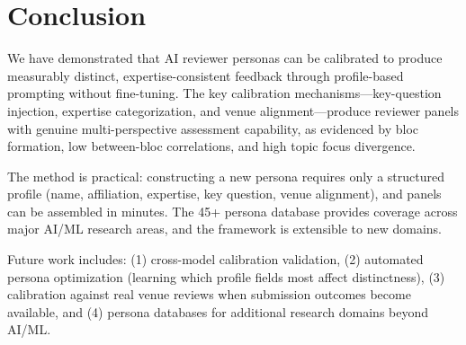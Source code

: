 \section{Conclusion}

We have demonstrated that AI reviewer personas can be calibrated to produce measurably distinct, expertise-consistent feedback through profile-based prompting without fine-tuning. The key calibration mechanisms---key-question injection, expertise categorization, and venue alignment---produce reviewer panels with genuine multi-perspective assessment capability, as evidenced by bloc formation, low between-bloc correlations, and high topic focus divergence.

The method is practical: constructing a new persona requires only a structured profile (name, affiliation, expertise, key question, venue alignment), and panels can be assembled in minutes. The 45+ persona database provides coverage across major AI/ML research areas, and the framework is extensible to new domains.

Future work includes: (1) cross-model calibration validation, (2) automated persona optimization (learning which profile fields most affect distinctness), (3) calibration against real venue reviews when submission outcomes become available, and (4) persona databases for additional research domains beyond AI/ML.
